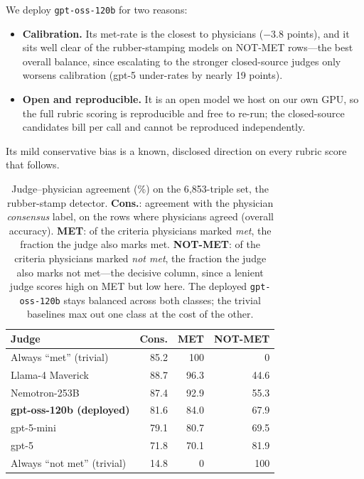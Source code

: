 We deploy \texttt{gpt-oss-120b} for two reasons:
\begin{itemize}
  \item \textbf{Calibration.} Its met-rate is the closest to physicians
  ($-3.8$ points), and it sits well clear of the rubber-stamping models on
  NOT-MET rows---the best overall balance, since escalating to the stronger
  closed-source judges only worsens calibration (gpt-5 under-rates by nearly
  19 points).
  \item \textbf{Open and reproducible.} It is an open model we host on our
  own GPU, so the full rubric scoring is reproducible and free to re-run;
  the closed-source candidates bill per call and cannot be reproduced
  independently.
\end{itemize}
Its mild conservative bias is a known, disclosed direction on every rubric
score that follows.

\begin{table}[t]
\caption{Judge--physician agreement (\%) on the 6{,}853-triple set, the
rubber-stamp detector. \textbf{Cons.}: agreement with the physician
\emph{consensus} label, on the rows where physicians agreed (overall
accuracy). \textbf{MET}: of the criteria physicians marked \emph{met}, the
fraction the judge also marks met. \textbf{NOT-MET}: of the criteria
physicians marked \emph{not met}, the fraction the judge also marks not
met---the decisive column, since a lenient judge scores high on MET but low
here. The deployed \texttt{gpt-oss-120b} stays balanced across both classes;
the trivial baselines max out one class at the cost of the other.}
\label{tab:judge}
\small
\begin{tabular}{@{}lrrr@{}}
\toprule
Judge & Cons. & MET & NOT-MET \\
\midrule
Always ``met'' (trivial) & 85.2 & 100\phantom{.0} & 0\phantom{.0} \\
Llama-4 Maverick & 88.7 & 96.3 & 44.6 \\
Nemotron-253B & 87.4 & 92.9 & 55.3 \\
\textbf{gpt-oss-120b (deployed)} & 81.6 & 84.0 & 67.9 \\
gpt-5-mini & 79.1 & 80.7 & 69.5 \\
gpt-5 & 71.8 & 70.1 & 81.9 \\
Always ``not met'' (trivial) & 14.8 & 0\phantom{.0} & 100\phantom{.0} \\
\bottomrule
\end{tabular}
\end{table}

\FloatBarrier
